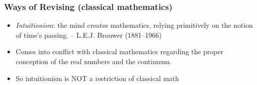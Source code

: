 \begin{frame}
\frametitle{Ways of Revising (classical mathematics)}

\begin{itemize}[<+->]

\item \emph{Intuitionism}: the mind creates mathematics, relying primitively on the notion of time's passing. -- L.E.J. Brouwer (1881--1966)
\bi
\item Comes into conflict with classical mathematics regarding the proper conception of the real numbers and the continuum. 
\item So intuitionism is NOT a restriction of classical math
\ei





\end{itemize}
\end{frame}
